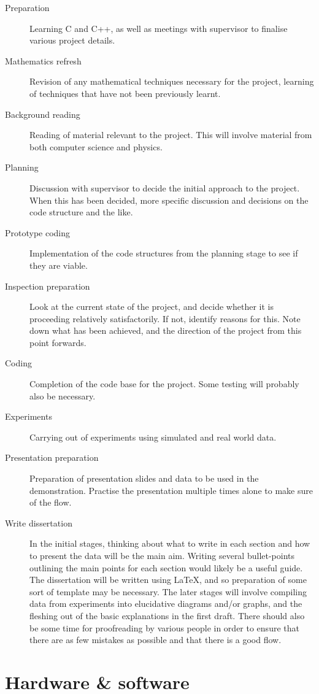 \documentclass[10pt,a4paper]{article}
\begin{document}
\begin{description}
\item[Preparation] Learning C and C++, as well as meetings with supervisor to finalise various project details.
\item[Mathematics refresh] Revision of any mathematical techniques necessary for the project, learning of techniques that have not been previously learnt.
\item[Background reading] Reading of material relevant to the project. This will involve material from both computer science and physics.
\item[Planning] Discussion with supervisor to decide the initial approach to the project. When this has been decided, more specific discussion and decisions on the code structure and the like.
\item[Prototype coding] Implementation of the code structures from the planning stage to see if they are viable.
\item[Inspection preparation] Look at the current state of the project, and decide whether it is proceeding relatively satisfactorily. If not, identify reasons for this. Note down what has been achieved, and the direction of the project from this point forwards.
\item[Coding] Completion of the code base for the project. Some testing will probably also be necessary.
\item[Experiments] Carrying out of experiments using simulated and real world data.
\item[Presentation preparation] Preparation of presentation slides and data to be used in the demonstration. Practise the presentation multiple times alone to make sure of the flow.
\item[Write dissertation] In the initial stages, thinking about what to write in each section and how to present the data will be the main aim. Writing several bullet-points outlining the main points for each section would likely be a useful guide. The dissertation will be written using \LaTeX, and so preparation of some sort of template may be necessary. The later stages will involve compiling data from experiments into elucidative diagrams and/or graphs, and the fleshing out of the basic explanations in the first draft. There should also be some time for proofreading by various people in order to ensure that there are as few mistakes as possible and that there is a good flow.
\end{description}

\section*{Hardware \& software}
\end{document}
